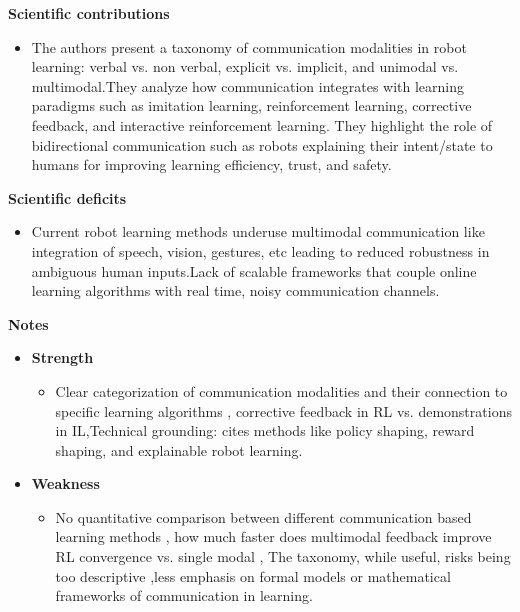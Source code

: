 \documentclass[report.tex]{subfiles}
\begin{document}
\noindent\textbf{Scientific contributions} 
\begin{itemize}
        \item   The authors present a taxonomy of communication modalities in robot learning: verbal vs. non verbal, explicit vs. implicit, and unimodal vs. multimodal.They analyze how communication integrates with learning paradigms such as imitation learning, reinforcement learning, corrective feedback, and interactive reinforcement learning. They highlight the role of bidirectional communication  such as robots explaining their intent/state to humans  for improving learning efficiency, trust, and safety.
        
\end{itemize}

\noindent\textbf{Scientific deficits} 
\begin{itemize}
        \item  Current robot learning methods underuse multimodal communication  like integration of speech, vision, gestures, etc leading to reduced robustness in ambiguous human inputs.Lack of scalable frameworks that couple online learning algorithms with real time, noisy communication channels.
        
       
\end{itemize}

\noindent\textbf{Notes}
\begin{itemize}
    \item \noindent\textbf {Strength}
    \begin{itemize}
        \item Clear categorization of communication modalities and their connection to specific learning algorithms , corrective feedback in RL vs. demonstrations in IL,Technical grounding: cites methods like policy shaping, reward shaping, and explainable robot learning.
        
       
    \end{itemize}
    
    \item \noindent\textbf{Weakness}
    \begin{itemize}
        \item No quantitative comparison between different communication based learning methods  , how much faster does multimodal feedback improve RL convergence vs. single modal , The taxonomy, while useful, risks being too descriptive ,less emphasis on formal models or mathematical frameworks of communication in learning.
    \end{itemize}
\end{itemize}
\end{document}
